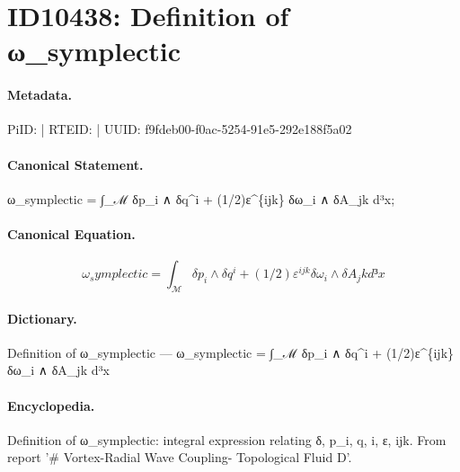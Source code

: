 \section*{ID10438: Definition of ω\_symplectic}
\paragraph{Metadata.}
PiID:  | RTEID:  | UUID: f9fdeb00-f0ac-5254-91e5-292e188f5a02

\paragraph{Canonical Statement.}
ω\_symplectic = ∫\_ℳ δp\_i ∧ δq\textasciicircum{}i + (1/2)ε\textasciicircum{}\{ijk\} δω\_i ∧ δA\_jk d³x;

\paragraph{Canonical Equation.}
\[
ω_symplectic = ∫_ℳ δp_i ∧ δq^i + (1/2)ε^{ijk} δω_i ∧ δA_jk d³x
\]

\paragraph{Dictionary.}
Definition of ω\_symplectic — ω\_symplectic = ∫\_ℳ δp\_i ∧ δq\textasciicircum{}i + (1/2)ε\textasciicircum{}\{ijk\} δω\_i ∧ δA\_jk d³x

\paragraph{Encyclopedia.}
Definition of ω\_symplectic: integral expression relating δ, p\_i, q, i, ε, ijk. From report '\# Vortex-Radial Wave Coupling- Topological Fluid D'.
